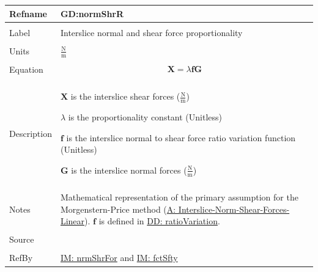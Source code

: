 \documentclass[12pt]{article}
\begin{document}
\noindent \begin{minipage}{\textwidth}
\begin{tabular}{>{\raggedright}p{}>{\raggedright\arraybackslash}p{}}
\toprule \textbf{Refname} & \textbf{GD:normShrR}
\label{GD:normShrR}
\\ \midrule \\
Label & Interslice normal and shear force proportionality
\\ \midrule \\
Units & $\frac{\text{N}}{\text{m}}$
\\ \midrule \\
Equation & \begin{displaymath}
           \mathbf{X}=λ \mathbf{f} \mathbf{G}
           \end{displaymath}
\\ \midrule \\
Description & \begin{symbDescription}
              \item{$\mathbf{X}$ is the interslice shear forces ($\frac{\text{N}}{\text{m}}$)}
              \item{$λ$ is the proportionality constant (Unitless)}
              \item{$\mathbf{f}$ is the interslice normal to shear force ratio variation function (Unitless)}
              \item{$\mathbf{G}$ is the interslice normal forces ($\frac{\text{N}}{\text{m}}$)}
              \end{symbDescription}
\\ \midrule \\
Notes & Mathematical representation of the primary assumption for the Morgenstern-Price method (\hyperref[assumpINSFL]{A: Interslice-Norm-Shear-Forces-Linear}). $\mathbf{f}$ is defined in \hyperref[DD:ratioVariation]{DD: ratioVariation}.
\\ \midrule \\
Source & \cite{chen2005}
\\ \midrule \\
RefBy & \hyperref[IM:nrmShrFor]{IM: nrmShrFor} and \hyperref[IM:fctSfty]{IM: fctSfty}
\\ \bottomrule
\end{tabular}
\end{minipage}
\par~
\end{document}
